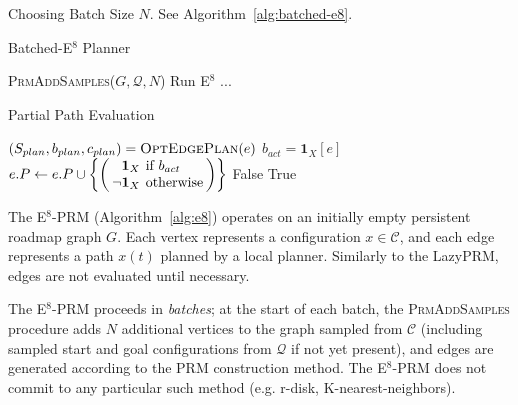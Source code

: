 Choosing Batch Size $N$.
See Algorithm~\ref{alg:batched-e8}.

\begin{algorithm}
\caption{Batched-E$^8$ Planner}
\label{alg:batched-e8}
\begin{algorithmic}[1]
\Loop
   \State \textsc{PrmAddSamples}($G, \mathcal{Q}, N$)
   \State Run E$^8$ ...
\EndLoop
\EndProcedure
\end{algorithmic}
\end{algorithm}

\begin{algorithm}
\caption{Partial Path Evaluation}
\label{alg:path-evaluation}
\begin{algorithmic}[1]
         \label{line:edge-evaluation-order}
      \State $(S_{plan}, b_{plan}, c_{plan})
         = \mbox{\textsc{OptEdgePlan}}(e)$
         \State $b_{act} = \mathbf{1}_X[e]$
         \State $\arraycolsep=2pt
            e.P \leftarrow e.P \cup
            \left\{\left( \begin{array}{rl}
            \mathbf{1}_X & \mbox{if } b_{act} \\
            \lnot \mathbf{1}_X & \mbox{otherwise} \\
            \end{array} \right)
            \right\}$
            \State \Return False
         \EndIf
      \EndFor
   \EndFor
   \State \Return True
\EndFunction
\end{algorithmic}
\end{algorithm}

The E$^8$-PRM (Algorithm~\ref{alg:e8})
operates on an initially empty persistent roadmap graph $G$.
Each vertex represents a configuration $x \in \mathcal{C}$,
and each edge represents a path $x(t)$ planned by a local planner.
Similarly to the LazyPRM,
edges are not evaluated until necessary.

The E$^8$-PRM proceeds in \emph{batches};
at the start of each batch,
the \textsc{PrmAddSamples} procedure adds
$N$ additional vertices to the graph sampled from $\mathcal{C}$
(including sampled start and goal configurations from $\mathcal{Q}$
if not yet present),
and edges are generated according to the PRM construction method.
The E$^8$-PRM does not commit to any particular such method
(e.g. r-disk, K-nearest-neighbors).

